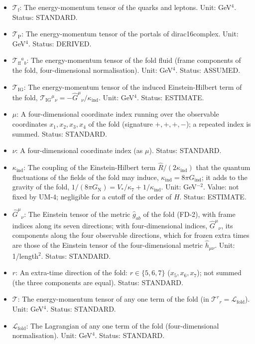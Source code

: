 \documentclass[
  10pt,
]{article}
\begin{document}
\begin{itemize}
  \(\mathcal{T}_{\mathrm{H}}\): The energy-momentum tensor of the Higgs
  doublet (four-dimensional normalisation). Unit: GeV\(^4\). Status:
  STANDARD.
\item
  \(\mathcal{T}_{\mathrm{f}}\): The energy-momentum tensor of the quarks
  and leptons. Unit: GeV\(^4\). Status: STANDARD.
\item
  \(\mathcal{T}_{\mathrm{P}}\): The energy-momentum tensor of the
  portals of dirac16complex. Unit: GeV\(^4\). Status: DERIVED.
\item
  \(\mathcal{T}_{\mathrm{ff}}{}^a{}_b\): The energy-momentum tensor of
  the fold fluid (frame components of the fold, four-dimensional
  normalisation). Unit: GeV\(^4\). Status: ASSUMED.
\item
  \(\mathcal{T}_{\mathrm{IG}}\): The energy-momentum tensor of the
  induced Einstein-Hilbert term of the fold,
  \(\mathcal{T}_{\mathrm{IG}}{}^\mu{}_\nu = -\hat G^\mu{}_\nu/\kappa_{\mathrm{ind}}\).
  Unit: GeV\(^4\). Status: ESTIMATE.
\item
  \(\mu\): A four-dimensional coordinate index running over the
  observable coordinates \(x_1, x_2, x_3, x_4\) of the fold (signature
  \(+,+,+,-\)); a repeated index is summed. Status: STANDARD.
\item
  \(\nu\): A four-dimensional coordinate index (as \(\mu\)). Status:
  STANDARD.
\item
  \(\kappa_{\mathrm{ind}}\): The coupling of the Einstein-Hilbert term
  \(\hat R/(2\kappa_{\mathrm{ind}})\) that the quantum fluctuations of
  the fields of the fold may induce,
  \(\kappa_{\mathrm{ind}} = 8\pi G_{\mathrm{ind}}\); it adds to the
  gravity of the fold,
  \(1/(8\pi G_{\mathrm{N}}) = V_*/\kappa_7 + 1/\kappa_{\mathrm{ind}}\).
  Unit: GeV\(^{-2}\). Value: not fixed by UM-4; negligible for a cutoff
  of the order of \(H\). Status: ESTIMATE.
\item
  \(\hat G^\mu{}_\nu\): The Einstein tensor of the metric
  \(\hat g_{ab}\) of the fold (FD-2), with frame indices along its seven
  directions; with four-dimensional indices, \(\hat G^\mu{}_\nu\), its
  components along the four observable directions, which for frozen
  extra times are those of the Einstein tensor of the four-dimensional
  metric \(\hat h_{\mu\nu}\). Unit: 1/length\(^2\). Status: STANDARD.
\item
  \(r\): An extra-time direction of the fold: \(r \in \{5, 6, 7\}\)
  (\(x_5, x_6, x_7\)); not summed (the three components are equal).
  Status: STANDARD.
\item
  \(\mathcal{T}\): The energy-momentum tensor of any one term of the
  fold (in \(\mathcal{T}^r{}_r = \mathcal{L}_{\mathrm{fold}}\)). Unit:
  GeV\(^4\). Status: STANDARD.
\item
  \(\mathcal{L}_{\mathrm{fold}}\): The Lagrangian of any one term of the
  fold (four-dimensional normalisation). Unit: GeV\(^4\). Status:
  STANDARD.
\end{itemize}
\end{document}
